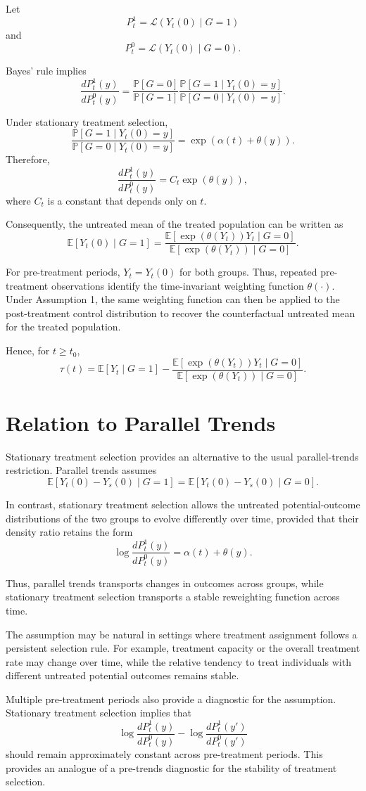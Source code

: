 \documentclass[11pt]{article}
\begin{document}
Let
\[
P_t^1
=
\mathcal L(Y_t(0)\mid G=1)
\]
and
\[
P_t^0
=
\mathcal L(Y_t(0)\mid G=0).
\]

Bayes' rule implies
\[
\frac{dP_t^1(y)}{dP_t^0(y)}
=
\frac{\mathbb P[G=0]}{\mathbb P[G=1]}
\frac{
\mathbb P[G=1\mid Y_t(0)=y]
}{
\mathbb P[G=0\mid Y_t(0)=y]
}.
\]

Under stationary treatment selection,
\[
\frac{
\mathbb P[G=1\mid Y_t(0)=y]
}{
\mathbb P[G=0\mid Y_t(0)=y]
}
=
\exp(\alpha(t)+\theta(y)).
\]
Therefore,
\[
\frac{dP_t^1(y)}{dP_t^0(y)}
=
C_t\exp(\theta(y)),
\]
where $C_t$ is a constant that depends only on $t$.

Consequently, the untreated mean of the treated population can be written as
\[
\mathbb E[Y_t(0)\mid G=1]
=
\frac{
\mathbb E[\exp(\theta(Y_t))Y_t\mid G=0]
}{
\mathbb E[\exp(\theta(Y_t))\mid G=0]
}.
\]

For pre-treatment periods, $Y_t=Y_t(0)$ for both groups. Thus, repeated pre-treatment observations identify the time-invariant weighting function $\theta(\cdot)$. Under Assumption 1, the same weighting function can then be applied to the post-treatment control distribution to recover the counterfactual untreated mean for the treated population.

Hence, for $t\ge t_0$,
\[
\tau(t)
=
\mathbb E[Y_t\mid G=1]
-
\frac{
\mathbb E[\exp(\theta(Y_t))Y_t\mid G=0]
}{
\mathbb E[\exp(\theta(Y_t))\mid G=0]
}.
\]

\section{Relation to Parallel Trends}

Stationary treatment selection provides an alternative to the usual parallel-trends restriction. Parallel trends assumes
\[
\mathbb E[Y_t(0)-Y_s(0)\mid G=1]
=
\mathbb E[Y_t(0)-Y_s(0)\mid G=0].
\]

In contrast, stationary treatment selection allows the untreated potential-outcome distributions of the two groups to evolve differently over time, provided that their density ratio retains the form
\[
\log
\frac{dP_t^1(y)}{dP_t^0(y)}
=
\alpha(t)+\theta(y).
\]

Thus, parallel trends transports changes in outcomes across groups, while stationary treatment selection transports a stable reweighting function across time.

The assumption may be natural in settings where treatment assignment follows a persistent selection rule. For example, treatment capacity or the overall treatment rate may change over time, while the relative tendency to treat individuals with different untreated potential outcomes remains stable.

Multiple pre-treatment periods also provide a diagnostic for the assumption. Stationary treatment selection implies that
\[
\log\frac{dP_t^1(y)}{dP_t^0(y)}
-
\log\frac{dP_t^1(y')}{dP_t^0(y')}
\]
should remain approximately constant across pre-treatment periods. This provides an analogue of a pre-trends diagnostic for the stability of treatment selection.
\end{document}
